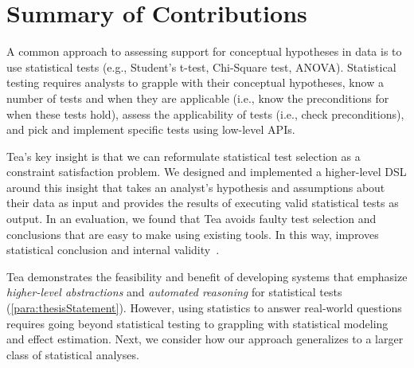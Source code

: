 \begin{comment}
Second, a usability issue with Tea's current API is its reliance of ``magic
strings.'' We are currently refactoring the API to be more object-oriented by
extending Tisane's variables data classes. We hope this revision will be more
usable with ``free'' help from existing IDEs such as VSCode that provide API
suggestions inline when specifying parameters. 

Both features will be incorporated into a new release of Tea, which I have
currently scheduled for June, 2022. 
\end{comment}

\section{Summary of Contributions} \label{sec:summaryTea}


A common approach to assessing support for conceptual hypotheses in data is to
use statistical tests (e.g., Student's t-test, Chi-Square test, ANOVA).
Statistical testing requires analysts to grapple with their conceptual
hypotheses, know a number of tests and when they are applicable (i.e., know the
preconditions for when these tests hold), assess the applicability of tests
(i.e., check preconditions), and pick and implement specific tests using
low-level APIs. 

Tea's key insight is that we can reformulate statistical test
selection as a constraint satisfaction problem. We designed and implemented a
higher-level DSL around this insight that takes an analyst's hypothesis and
assumptions about their data as input and provides the results of executing
valid statistical tests as output. In an evaluation, we found that Tea avoids
faulty test selection and conclusions that are easy to make using existing
tools. In this way, \tea improves statistical conclusion and internal validity~\cite{shadish2010campbell}. 

Tea demonstrates the feasibility and benefit of developing systems that
emphasize \textit{higher-level abstractions} and \textit{automated reasoning}
for statistical tests (\autoref{para:thesisStatement}). However, using
statistics to answer real-world questions requires going beyond statistical
testing to grappling with statistical modeling and effect estimation. Next, we
consider how our approach generalizes to a larger class of statistical analyses. 

